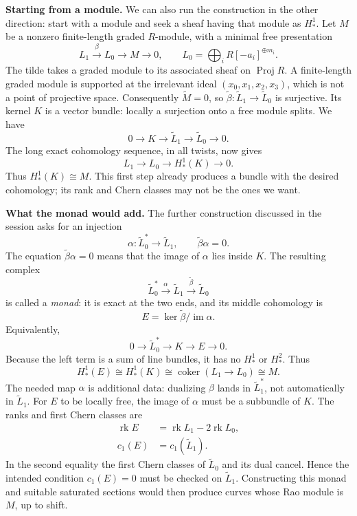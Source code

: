 \documentclass[11pt,a4paper]{article}
\theoremstyle{remark}
\begin{document}
\textbf{Starting from a module.}
We can also run the construction in
the other direction: start with a
module and seek a sheaf having that
module as $H^1_*$.
Let $M$ be a nonzero finite-length
graded $R$-module, with a minimal
free presentation
$$
L_1\xrightarrow{\beta}L_0
\longrightarrow M\longrightarrow0,
\qquad L_0=
\bigoplus_iR[-a_i]^{\oplus m_i}.
$$
The tilde takes a graded module to
its associated sheaf on
$\operatorname{Proj}R$.
A finite-length graded module is
supported at the irrelevant ideal
$(x_0,x_1,x_2,x_3)$, which is not a
point of projective space.
Consequently $\widetilde M=0$, so
$\widetilde\beta:\widetilde L_1
\to\widetilde L_0$ is surjective.
Its kernel $K$ is a vector bundle:
locally a surjection onto a free
module splits. We have
$$
0\longrightarrow K
\longrightarrow\widetilde L_1
\longrightarrow\widetilde L_0
\longrightarrow0.
$$
The long exact cohomology sequence,
in all twists, now gives
$$
L_1\longrightarrow L_0
\longrightarrow H^1_*(K)
\longrightarrow0.
$$
Thus $H^1_*(K)\cong M$.
This first step already produces a
bundle with the desired cohomology;
its rank and Chern classes may not
be the ones we want.

\textbf{What the monad would add.}
The further construction discussed
in the session asks for an injection
$$
\alpha:\widetilde L_0^*
\longrightarrow\widetilde L_1,
\qquad\widetilde\beta\alpha=0.
$$
The equation $\widetilde\beta\alpha=0$
means that the image of $\alpha$ lies
inside $K$. The resulting complex
$$
\widetilde L_0^*
\xrightarrow{\alpha}\widetilde L_1
\xrightarrow{\widetilde\beta}
\widetilde L_0
$$
is called a \emph{monad}: it is exact
at the two ends, and its middle
cohomology is
$$
E=\ker\widetilde\beta/
\operatorname{im}\alpha.
$$
Equivalently,
$$
0\longrightarrow\widetilde L_0^*
\longrightarrow K\longrightarrow E
\longrightarrow0.
$$
Because the left term is a sum of
line bundles, it has no $H^1_*$ or
$H^2_*$. Thus
$$
H^1_*(E)\cong H^1_*(K)
\cong\operatorname{coker}(L_1\to L_0)
\cong M.
$$
The needed map $\alpha$ is
additional data: dualizing $\beta$
lands in $\widetilde L_1^*$, not
automatically in $\widetilde L_1$.
For $E$ to be locally free, the image
of $\alpha$ must be a subbundle of $K$.
The ranks and first Chern classes are
$$
\begin{aligned}
\operatorname{rk}E
&=\operatorname{rk}L_1
-2\operatorname{rk}L_0,\\
c_1(E)&=c_1(\widetilde L_1).
\end{aligned}
$$
In the second equality the first Chern
classes of $\widetilde L_0$ and its
dual cancel. Hence the intended
condition $c_1(E)=0$ must be checked
on $\widetilde L_1$.
Constructing this monad and suitable
saturated sections would then produce
curves whose Rao module is $M$, up to
shift.
\end{document}
